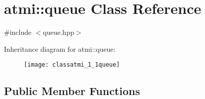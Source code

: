 \hypertarget{classatmi_1_1queue}{\section{atmi\+:\+:queue Class Reference}
\label{classatmi_1_1queue}
}


{\ttfamily \#include $<$queue.\+hpp$>$}

Inheritance diagram for atmi\+:\+:queue\+:\begin{figure}[H]
\begin{center}
\leavevmode
\texttt{[image: classatmi\_1\_1queue]}
\end{center}
\end{figure}
\subsection*{Public Member Functions}
